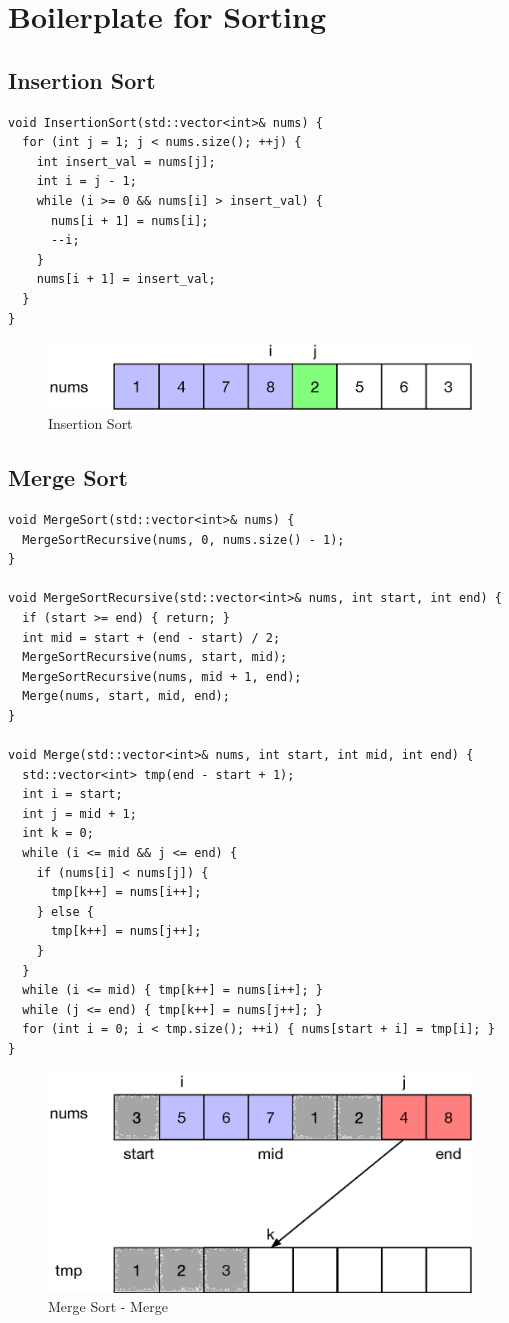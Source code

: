 \chapter{Boilerplate for Sorting}
\section{Insertion Sort}
\begin{lstlisting}
void InsertionSort(std::vector<int>& nums) {
  for (int j = 1; j < nums.size(); ++j) {
    int insert_val = nums[j];
    int i = j - 1;
    while (i >= 0 && nums[i] > insert_val) {
      nums[i + 1] = nums[i];
      --i;
    }
    nums[i + 1] = insert_val;
  }
}
\end{lstlisting}
\begin{figure}[H]
	\centering
	\includegraphics[width=0.5\linewidth]{images/insertion_sort}
	\caption{Insertion Sort}
	\label{fig:insertionsort}
\end{figure}

\section{Merge Sort}\label{merge_sort}
\begin{lstlisting}
void MergeSort(std::vector<int>& nums) {
  MergeSortRecursive(nums, 0, nums.size() - 1);
}

void MergeSortRecursive(std::vector<int>& nums, int start, int end) {
  if (start >= end) { return; }
  int mid = start + (end - start) / 2;
  MergeSortRecursive(nums, start, mid);
  MergeSortRecursive(nums, mid + 1, end);
  Merge(nums, start, mid, end);
}

void Merge(std::vector<int>& nums, int start, int mid, int end) {
  std::vector<int> tmp(end - start + 1);
  int i = start;
  int j = mid + 1;
  int k = 0;
  while (i <= mid && j <= end) {
    if (nums[i] < nums[j]) {
      tmp[k++] = nums[i++];
    } else {
      tmp[k++] = nums[j++];
    }
  }
  while (i <= mid) { tmp[k++] = nums[i++]; }
  while (j <= end) { tmp[k++] = nums[j++]; }
  for (int i = 0; i < tmp.size(); ++i) { nums[start + i] = tmp[i]; }
}
\end{lstlisting}

\begin{figure}[H]
	\centering
	\includegraphics[width=0.5\linewidth]{images/merge_sort}
	\caption{Merge Sort - Merge}
	\label{fig:mergesort}
\end{figure}

